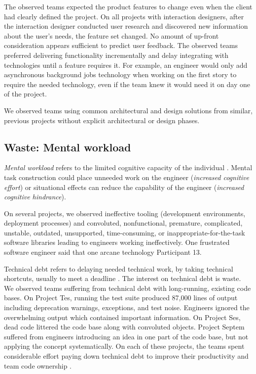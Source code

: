 The observed teams expected the product features to change even when the client had clearly defined the project. On all projects with interaction designers, after the interaction designer conducted user research and discovered new information about the user's needs, the feature set changed. No amount of up-front consideration appears sufficient to predict user feedback. The observed teams preferred delivering functionality incrementally and delay integrating with technologies until a feature requires it. For example, an engineer would only add asynchronous background jobs technology when working on the first story to require the needed technology, even if the team knew it would need it on day one of the project.

We observed teams using common architectural and design solutions from similar, previous projects without explicit architectural or design phases.

\subsection{Waste: Mental workload}
\textit{Mental workload} refers to the limited cognitive capacity of the individual \cite{Longo2014Dissertation}. Mental task construction could place unneeded work on the engineer (\textit{increased cognitive effort}) or situational effects can reduce the capability of the engineer (\textit{increased cognitive hindrance}).

On several projects, we observed ineffective tooling (development environments, deployment processes) and convoluted, nonfunctional, premature, complicated, unstable, outdated, unsupported, time-consuming, or inappropriate-for-the-task software libraries leading to engineers working ineffectively. One frustrated software engineer said that one arcane technology  \textemdash Participant 13.

Technical debt refers to delaying needed technical work, by taking technical shortcuts, usually to meet a deadline \cite{McConnellTechnicalDebt}. The interest on technical debt is waste. We observed teams suffering from technical debt with long-running, existing code bases. On Project Tes, running the test suite produced 87,000 lines of output including deprecation warnings, exceptions, and test noise. Engineers ignored the overwhelming output which contained important information.  On Project Ses, dead code littered the code base along with convoluted objects. Project Septem suffered from engineers introducing an idea in one part of the code base, but not applying the concept systematically.  On each of these projects, the teams spent considerable effort paying down technical debt to improve their productivity and team code ownership \cite{SedanoTeamCodeOwnership}.  

